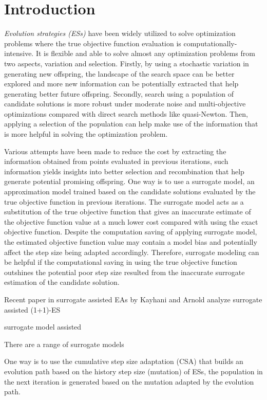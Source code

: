 \section{Introduction}

\textit{Evolution strategies (ESs)} have been widely utilized to solve optimization problems where the true objective function evaluation is computationally-intensive. It is flexible and able to solve almost any optimization problems from two aspects, variation and selection. Firstly, by using a stochastic variation in generating new offspring, the landscape of the search space can be better explored and more new information can be potentially extracted that help generating better future offspring.   Secondly, search using a population of candidate solutions is more robust under moderate noise and multi-objective optimizations compared with direct search methods like quasi-Newton. Then, applying a selection of the population can help make use of the information that is more helpful in solving the optimization problem. 

Various attempts have been made to reduce the cost by extracting the information obtained from points evaluated in previous iterations, such information yields insights into better selection and recombination that help generate potential promising offspring. One way is to use a surrogate model, an approximation model trained based on the candidate solutions evaluated by the true objective function in previous iterations. The surrogate model acts as a substitution of the true objective function that gives an inaccurate estimate of the objective function value at a much lower cost compared with using the exact objective function. Despite the computation saving of applying surrogate model, the estimated objective function value may contain a model bias and potentially affect the step size being adapted accordingly. Therefore, surrogate modeling can be helpful if the computational saving in using the true objective function outshines the potential poor step size resulted from the inaccurate surrogate estimation of the candidate solution. 




Recent paper in surrogate assisted EAs by Kayhani and Arnold analyze surrogate assisted (1+1)-ES 


surrogate model assisted 

There are a range of surrogate models 


One way is to use the cumulative step size adaptation (CSA) \cite{Ostermeier:1994:DAS:1326675.1326679} that builds an evolution path based on the history step size (mutation) of ESs, the population in the next iteration is generated based on the mutation adapted by the evolution path. 


